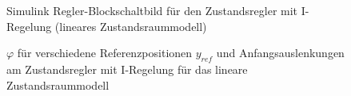 \documentclass[
	pagesize,
	fontsize=12pt,
	paper=a4,
	oneside,
   reqno
]{scrartcl}
\begin{document}
\begin{figure}[H]
    \centering
    \caption[Regler mit I-Regelung Simulink (linear)]{Simulink Regler-Blockschaltbild für den Zustandsregler mit I-Regelung (lineares Zustandsraummodell)}
    \label{fig:Bild17.5}
\end{figure}

\begin{figure}[H]
    \centering
    \caption[$\varphi$ für Regler mit I-Regelung (linear)]{$\varphi$ für verschiedene Referenzpositionen $y_{ref}$ und Anfangsauslenkungen am Zustandsregler mit I-Regelung für das lineare Zustandsraummodell}
    \label{fig:Bild18}
\end{figure}
\end{document}
